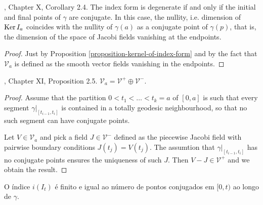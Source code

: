 \begin{lemma}
\label{lemma-index-form-is-degenerate-iff-conjugate-points}
\cite{doc}, Chapter X, Corollary 2.4. The index form is degenerate if and only 
if the initial and final points of $\gamma$ are conjugate. In this case, the 
nullity, i.e. dimension of $\mathop{\mathrm{Ker}} I_a$ coincides with the nullity of $\gamma(a)$ 
as a conjugate point of $\gamma(p)$, that is, the dimension of the space of 
Jacobi fields vanishing at the endpoints.
\end{lemma}

\begin{proof}
Just by Proposition \ref{proposition-kernel-of-index-form} and by the fact that
$\mathcal{V}_a$ is defined as the smooth vector fields vanishing in the
endpoints.
\end{proof}

\begin{proposition}
\label{proposition-V-is-direct-sum}
\cite{doc}, Chapter XI, Proposition 2.5. 
$\mathcal{V}_a=\mathcal{V}^+ \oplus \mathcal{V}^-$.
\end{proposition}

\begin{proof}
Assume that the partition $0<t_1<\ldots<t_k=a$ of $[0,a]$ is such that every
segment $\gamma|_{[t_{i-1},t_i]}$ is contained in a totally geodesic
neighbourhood, so that no such segment can have conjugate points.

Let $V \in \mathcal{V}_a$ and pick a field $J \in \mathcal{V}^-$ defined as the
piecewise Jacobi field with pairwise boundary conditions $J(t_j)=V(t_j)$. The
assumtion that $\gamma|_{[t_{i-1},t_i]}$ has no conjugate points ensures the
uniqueness of such $J$. Then $V-J\in\mathcal{V}^+$ and we obtain the result.
\end{proof}

\begin{theorem}
\label{theorem-morse-index}
O índice $i(I_t)$ é finito e igual ao número de pontos conjugados em $[0,t)$ ao
longo de $\gamma$.
\end{theorem}

